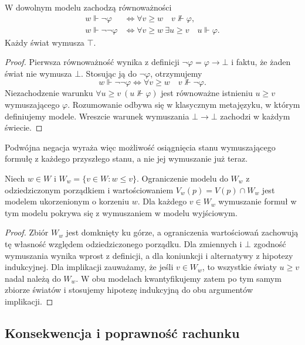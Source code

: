 \begin{stwierdzenie}
\label{prop:ncl-ipc-kripke-negation}
W dowolnym modelu zachodzą równoważności
\[
\begin{aligned}
 w\Vdash\neg\varphi
 &\iff \forall v\geq w\quad v\not\Vdash\varphi,\\
 w\Vdash\neg\neg\varphi
 &\iff \forall v\geq w\ \exists u\geq v
                  \quad u\Vdash\varphi.
\end{aligned}
\]
Każdy świat wymusza $\top$.
\end{stwierdzenie}
\begin{proof}
Pierwsza równoważność wynika z definicji
$\neg\varphi=\varphi\to\bot$ i faktu, że
żaden świat nie wymusza $\bot$.
Stosując ją do $\neg\varphi$, otrzymujemy
\[
 w\Vdash\neg\neg\varphi
 \iff \forall v\geq w\quad v\not\Vdash\neg\varphi.
\]
Niezachodzenie warunku
$\forall u\geq v\ (u\not\Vdash\varphi)$
jest równoważne istnieniu $u\geq v$ wymuszającego
$\varphi$. Rozumowanie odbywa się w klasycznym
metajęzyku, w którym definiujemy modele.
Wreszcie warunek wymuszania $\bot\to\bot$
zachodzi w każdym świecie.
\end{proof}
Podwójna negacja wyraża więc możliwość osiągnięcia
stanu wymuszającego formułę z każdego przyszłego
stanu, a nie jej wymuszanie już teraz.

\begin{stwierdzenie}
\label{prop:ncl-ipc-generated-submodel}
Niech $w\in W$ i $W_w=\{v\in W:w\leq v\}$.
Ograniczenie modelu do $W_w$ z odziedziczonym
porządkiem i wartościowaniem $V_w(p)=V(p)\cap W_w$
jest modelem ukorzenionym o korzeniu $w$.
Dla każdego $v\in W_w$ wymuszanie formuł w tym
modelu pokrywa się z wymuszaniem w modelu wyjściowym.
\end{stwierdzenie}
\begin{proof}
Zbiór $W_w$ jest domknięty ku górze, a ograniczenia
wartościowań zachowują tę własność względem
odziedziczonego porządku.
Dla zmiennych i $\bot$ zgodność wymuszania
wynika wprost z definicji, a dla koniunkcji
i alternatywy z hipotezy indukcyjnej.
Dla implikacji zauważamy, że jeśli $v\in W_w$,
to wszystkie światy $u\geq v$ nadal należą do $W_w$.
W obu modelach kwantyfikujemy zatem po tym samym
zbiorze światów i stosujemy hipotezę indukcyjną
do obu argumentów implikacji.
\end{proof}

\subsection{Konsekwencja i poprawność rachunku}

